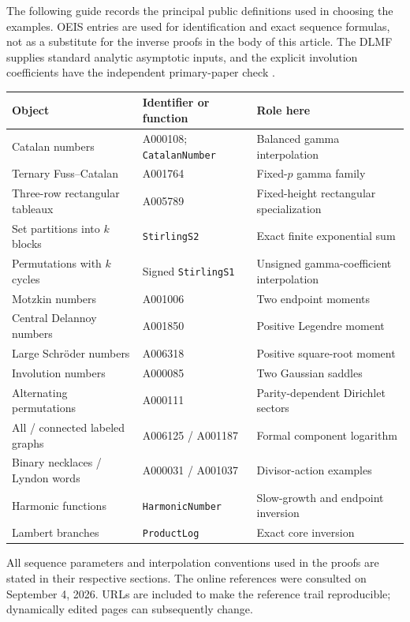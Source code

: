\documentclass[11pt,a4paper]{article}
\numberwithin{equation}{section}
\theoremstyle{definition}
\theoremstyle{remark}
\begin{document}
The following guide records the principal public definitions used in choosing the examples. OEIS entries are used for identification and exact sequence formulas, not as a substitute for the inverse proofs in the body of this article. The DLMF supplies standard analytic asymptotic inputs, and the explicit involution coefficients have the independent primary-paper check \cite{ekz}.

\begin{center}
\small
\begin{tabular}{P{51mm}P{35mm}P{56mm}}
\toprule
Object & Identifier or function & Role here\\\midrule
Catalan numbers & A000108; \texttt{CatalanNumber} & Balanced gamma interpolation\\
Ternary Fuss--Catalan & A001764 & Fixed-$p$ gamma family\\
Three-row rectangular tableaux & A005789 & Fixed-height rectangular specialization\\
Set partitions into $k$ blocks & \texttt{StirlingS2} & Exact finite exponential sum\\
Permutations with $k$ cycles & Signed \texttt{StirlingS1} & Unsigned gamma-coefficient interpolation\\
Motzkin numbers & A001006 & Two endpoint moments\\
Central Delannoy numbers & A001850 & Positive Legendre moment\\
Large Schr\"oder numbers & A006318 & Positive square-root moment\\
Involution numbers & A000085 & Two Gaussian saddles\\
Alternating permutations & A000111 & Parity-dependent Dirichlet sectors\\
All / connected labeled graphs & A006125 / A001187 & Formal component logarithm\\
Binary necklaces / Lyndon words & A000031 / A001037 & Divisor-action examples\\
Harmonic functions & \texttt{HarmonicNumber} & Slow-growth and endpoint inversion\\
Lambert branches & \texttt{ProductLog} & Exact core inversion\\\bottomrule
\end{tabular}
\end{center}

All sequence parameters and interpolation conventions used in the proofs are stated in their respective sections. The online references were consulted on September 4, 2026. URLs are included to make the reference trail reproducible; dynamically edited pages can subsequently change.
\end{document}
